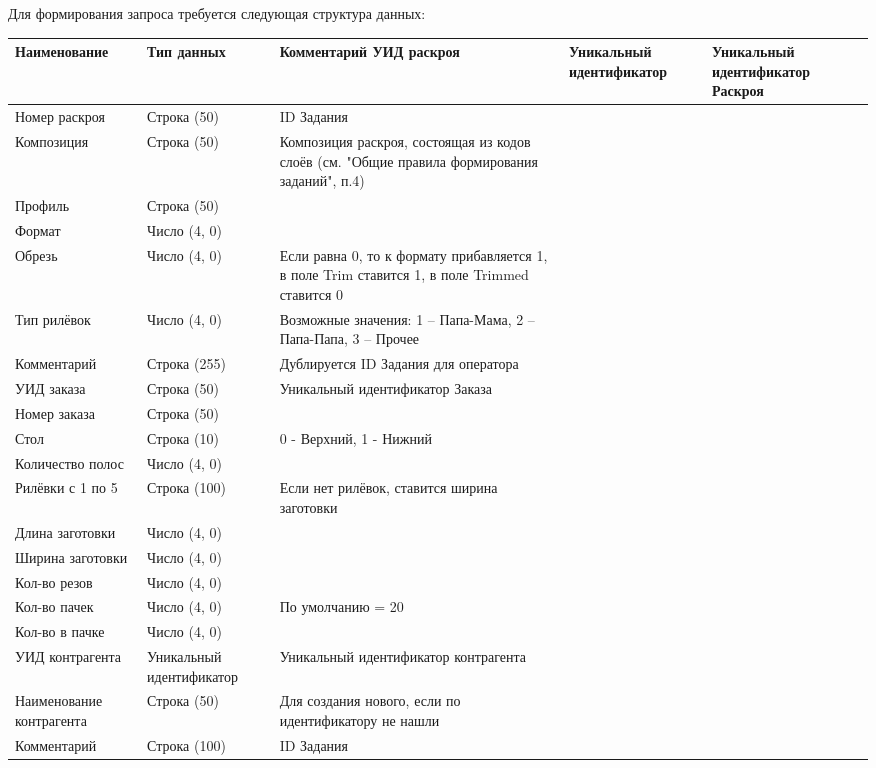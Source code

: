 Для формирования запроса требуется следующая структура данных:
\pc
\begin{longtable}{|p{4cm}|p{4cm}|p{8cm}|}
\hline
{\bf Наименование} & {\bf Тип данных} &  {\bf Комментарий} \endhead
    \hline
    УИД раскроя &	Уникальный идентификатор	& Уникальный идентификатор Раскроя \\
    \hline
    Номер раскроя &	Строка (50)	& ID Задания \\
    \hline
    Композиция &	Строка (50)&	Композиция раскроя, состоящая из кодов слоёв
(см.  "Общие правила формирования заданий", п.4)\\
    \hline
    Профиль &	Строка (50)&	 \\
    \hline
    Формат &	Число (4, 0)	 \\
        \hline
     Обрезь&	Число (4, 0)&	Если равна 0, то к формату прибавляется 1, 
в поле Trim ставится 1, в поле Trimmed ставится 0\\
        \hline
    Тип рилёвок&	Число (4, 0)	& Возможные значения: 
1 – Папа-Мама, 2 – Папа-Папа, 3 – Прочее\\
        \hline
    Комментарий&	Строка (255)&	Дублируется ID Задания для оператора\\
        \hline
    УИД заказа&	Строка (50)& Уникальный идентификатор Заказа \\
        \hline
    Номер заказа&	Строка (50)&	 \\
        \hline
    Стол&	Строка (10)& 0 - Верхний, 1 - Нижний \\
        \hline
     Количество полос&	Число (4, 0)&	 \\
        \hline
     Рилёвки с 1 по 5&	Строка (100)&	Если нет рилёвок, ставится ширина заготовки\\
        \hline
     Длина заготовки&	Число (4, 0)	 &\\
     \hline
     Ширина заготовки&	Число (4, 0)	 &\\
    \hline
     Кол-во резов	&Число (4, 0)&	 \\
    \hline
     Кол-во пачек	&Число (4, 0)&	По умолчанию = 20\\
    \hline
     Кол-во в пачке&	Число (4, 0)&\\	%
    \hline
     УИД контрагента & Уникальный идентификатор &  Уникальный идентификатор контрагента\\
    \hline
     Наименование контрагента&	Строка (50)&	Для создания нового, если по идентификатору не нашли\\
    \hline
     Комментарий &	Строка (100)&	ID Задания\\
    \hline
\end{longtable}

